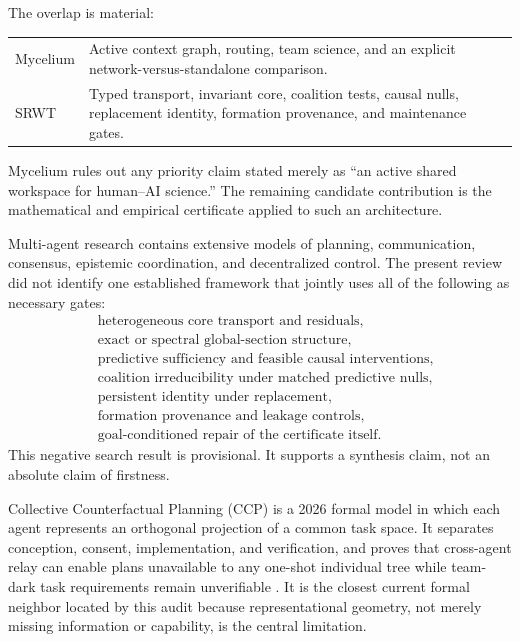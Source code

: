 The overlap is material:
\begin{center}
\small
\begin{tabularx}{0.94\textwidth}{@{}p{}X@{}}
\toprule
Mycelium & Active context graph, routing, team science, and an explicit
network-versus-standalone comparison. \\
SRWT & Typed transport, invariant core, coalition tests, causal nulls,
replacement identity, formation provenance, and maintenance gates. \\
\bottomrule
\end{tabularx}
\end{center}
Mycelium rules out any priority claim stated merely as ``an active shared
workspace for human--AI science.'' The remaining candidate contribution is the
mathematical and empirical certificate applied to such an architecture.


Multi-agent research contains extensive models of planning, communication,
consensus, epistemic coordination, and decentralized control. The present
review did not identify one established framework that jointly uses all of the
following as necessary gates:
\[
\begin{aligned}
&\text{heterogeneous core transport and residuals},\\
&\text{exact or spectral global-section structure},\\
&\text{predictive sufficiency and feasible causal interventions},\\
&\text{coalition irreducibility under matched predictive nulls},\\
&\text{persistent identity under replacement},\\
&\text{formation provenance and leakage controls},\\
&\text{goal-conditioned repair of the certificate itself}.
\end{aligned}
\]
This negative search result is provisional. It supports a synthesis claim, not
an absolute claim of firstness.



Collective Counterfactual Planning (CCP) is a 2026 formal model in which each
agent represents an orthogonal projection of a common task space. It separates
conception, consent, implementation, and verification, and proves that
cross-agent relay can enable plans unavailable to any one-shot individual tree
while team-dark task requirements remain unverifiable
\cite{Amornbunchornvej2026}. It is the closest current formal neighbor located
by this audit because representational geometry, not merely missing
information or capability, is the central limitation.

